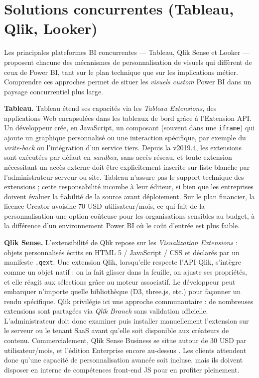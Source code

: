 \section{Solutions concurrentes (Tableau, Qlik, Looker)}
\label{sec:concurrence}

Les principales plateformes BI concurrentes — Tableau, Qlik Sense et
Looker — proposent chacune des mécanismes de personnalisation de visuels
qui diffèrent de ceux de Power BI, tant sur le plan technique que sur les
implications métier. Comprendre ces approches permet de situer les
\textit{visuels custom} Power BI dans un paysage concurrentiel plus large.

\textbf{Tableau.}
Tableau étend ses capacités via les \emph{Tableau Extensions}, des
applications Web encapsulées dans les tableaux de bord grâce à l’Extension
API\parencite{TableauExtGuide2024}. Un développeur crée, en JavaScript,
un composant (souvent dans une \texttt{iframe}) qui ajoute un graphique
personnalisé ou une interaction spécifique, par exemple du \emph{write-back}
ou l’intégration d’un service tiers\parencite{TableauBlogExt2024}. Depuis
la v2019.4, les extensions sont exécutées par défaut en \emph{sandbox},
sans accès réseau, et toute extension nécessitant un accès externe doit
être explicitement inscrite sur liste blanche par l’administrateur serveur
ou site\parencite{TableauAdmin2025}. Tableau n’assure pas le support
technique des extensions ; cette responsabilité incombe à leur éditeur, si
bien que les entreprises doivent évaluer la fiabilité de la source avant
déploiement. Sur le plan financier, la licence Creator avoisine
70 USD utilisateur/mois\parencite{TableauPricing2025}, ce qui fait de la
personnalisation une option coûteuse pour les organisations sensibles au
budget, à la différence d’un environnement Power BI où le coût d’entrée est
plus faible.

\textbf{Qlik Sense.}
L’extensibilité de Qlik repose sur les \emph{Visualization Extensions} :
objets personnalisés écrits en HTML 5 / JavaScript / CSS et déclarés par un
manifeste \texttt{.qext}\parencite{QlikDevHub2024}. Une extension Qlik,
lorsqu’elle respecte l’API Qlik, s’intègre comme un objet natif : on la
fait glisser dans la feuille, on ajuste ses propriétés, et elle réagit
aux sélections grâce au moteur associatif\parencite{QlikExtAPI2024}. Le
développeur peut embarquer n’importe quelle bibliothèque (D3, three.js,
etc.) pour façonner un rendu spécifique. Qlik privilégie ici une approche
communautaire : de nombreuses extensions sont partagées via
\emph{Qlik Branch} sans validation officielle. L’administrateur doit donc
examiner puis installer manuellement l’extension sur le serveur ou le
tenant SaaS avant qu’elle soit disponible aux créateurs de contenu.
Commercialement, Qlik Sense Business se situe autour de 30 USD par
utilisateur/mois, et l’édition Enterprise encore au-dessus
\parencite{QlikPricing2025}. Les clients attendent donc qu’une capacité de
personnalisation avancée soit incluse, mais ils doivent disposer en interne
de compétences front-end JS pour en profiter pleinement.

